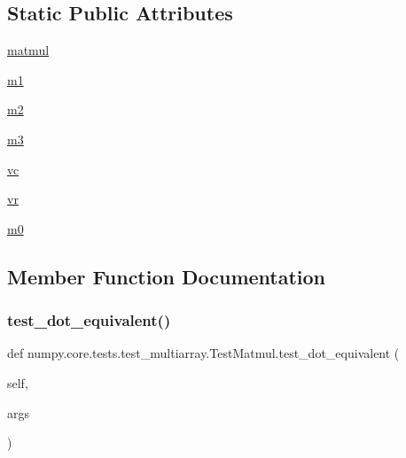 \subsection*{Static Public Attributes}
\begin{DoxyCompactItemize}
\item 
\hyperlink{classnumpy_1_1core_1_1tests_1_1test__multiarray_1_1TestMatmul_ad0a55bf00de8bf1a08279dba5e73891e}{matmul}
\item 
\hyperlink{classnumpy_1_1core_1_1tests_1_1test__multiarray_1_1TestMatmul_a1858cb883bf1c93c0bd9efa1cf47528e}{m1}
\item 
\hyperlink{classnumpy_1_1core_1_1tests_1_1test__multiarray_1_1TestMatmul_aa3c256dc29d56c4ebfeedb95c4aaa8ac}{m2}
\item 
\hyperlink{classnumpy_1_1core_1_1tests_1_1test__multiarray_1_1TestMatmul_a7c3c1be55a8ce43b304a19ec8735cef8}{m3}
\item 
\hyperlink{classnumpy_1_1core_1_1tests_1_1test__multiarray_1_1TestMatmul_a969fbc4853f53a853f5e12ce8c34c7c3}{vc}
\item 
\hyperlink{classnumpy_1_1core_1_1tests_1_1test__multiarray_1_1TestMatmul_a73b9a0afc2a2b460fbe7b55d4f8c4696}{vr}
\item 
\hyperlink{classnumpy_1_1core_1_1tests_1_1test__multiarray_1_1TestMatmul_a1e926eecfd9f61c1853913a896bbd8d0}{m0}
\end{DoxyCompactItemize}


\subsection{Member Function Documentation}
\mbox{\label{classnumpy_1_1core_1_1tests_1_1test__multiarray_1_1TestMatmul_aa61aa0b963630274644c0b7e650f8948}} 
\subsubsection{\texorpdfstring{test\+\_\+dot\+\_\+equivalent()}{test\_dot\_equivalent()}}
{\footnotesize\ttfamily def numpy.\+core.\+tests.\+test\+\_\+multiarray.\+Test\+Matmul.\+test\+\_\+dot\+\_\+equivalent (\begin{DoxyParamCaption}\item[{}]{self,  }\item[{}]{args }\end{DoxyParamCaption})}

